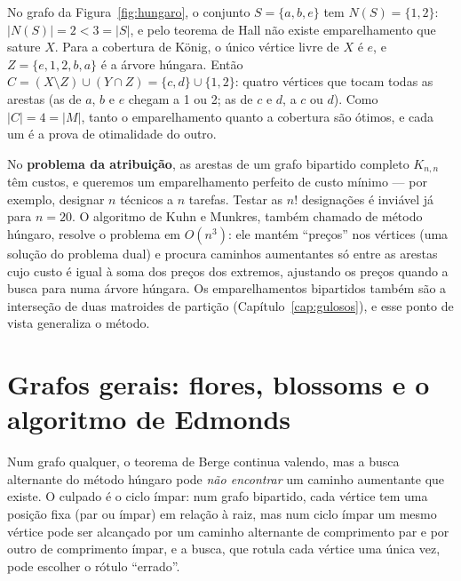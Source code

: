 \begin{exemplo}\label{ex:hall}
No grafo da Figura~\ref{fig:hungaro}, o conjunto $S=\{a,b,e\}$ tem $N(S)=\{1,2\}$: $|N(S)|=2<3=|S|$, e pelo teorema de Hall não existe emparelhamento que sature $X$. Para a cobertura de König, o único vértice livre de $X$ é $e$, e $Z=\{e,1,2,b,a\}$ é a árvore húngara. Então $C=(X\setminus Z)\cup(Y\cap Z)=\{c,d\}\cup\{1,2\}$: quatro vértices que tocam todas as arestas (as de $a$, $b$ e $e$ chegam a 1 ou 2; as de $c$ e $d$, a $c$ ou $d$). Como $|C|=4=|M|$, tanto o emparelhamento quanto a cobertura são ótimos, e cada um é a prova de otimalidade do outro.
\end{exemplo}

\begin{complemento}
No \textbf{problema da atribuição}, as arestas de um grafo bipartido completo $K_{n,n}$ têm custos, e queremos um emparelhamento perfeito de custo mínimo --- por exemplo, designar $n$ técnicos a $n$ tarefas. Testar as $n!$ designações é inviável já para $n=20$. O algoritmo de Kuhn e Munkres, também chamado de método húngaro, resolve o problema em $O(n^3)$: ele mantém ``preços'' nos vértices (uma solução do problema dual) e procura caminhos aumentantes só entre as arestas cujo custo é igual à soma dos preços dos extremos, ajustando os preços quando a busca para numa árvore húngara. Os emparelhamentos bipartidos também são a interseção de duas matroides de partição (Capítulo~\ref{cap:gulosos}), e esse ponto de vista generaliza o método.
\end{complemento}

\section{Grafos gerais: flores, blossoms e o algoritmo de Edmonds}\label{sec:blossom}
Num grafo qualquer, o teorema de Berge continua valendo, mas a busca alternante do método húngaro pode \emph{não encontrar} um caminho aumentante que existe. O culpado é o ciclo ímpar: num grafo bipartido, cada vértice tem uma posição fixa (par ou ímpar) em relação à raiz, mas num ciclo ímpar um mesmo vértice pode ser alcançado por um caminho alternante de comprimento par e por outro de comprimento ímpar, e a busca, que rotula cada vértice uma única vez, pode escolher o rótulo ``errado''.

